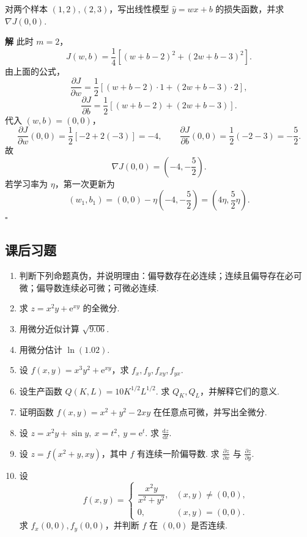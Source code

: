 \documentclass[fontset=fandol]{ctexart}
\newenvironment{solution}{\par\noindent\textbf{解}\quad}{\hfill$\square$\par\vspace{0.8em}}
\newcommand{\dd}{\mathrm{d}}
\newcommand{\ee}{\mathrm{e}}
\begin{document}
\begin{example}
对两个样本 $(1,2),(2,3)$，写出线性模型 $\hat y=wx+b$ 的损失函数，并求 $\nabla J(0,0)$.
\end{example}
\begin{solution}
此时 $m=2$，
\[
J(w,b)=\frac14\left[(w+b-2)^2+(2w+b-3)^2\right].
\]
由上面的公式，
\[
\frac{\partial J}{\partial w}
=\frac12\left[(w+b-2)\cdot1+(2w+b-3)\cdot2\right],
\]
\[
\frac{\partial J}{\partial b}
=\frac12\left[(w+b-2)+(2w+b-3)\right].
\]
代入 $(w,b)=(0,0)$，
\[
\frac{\partial J}{\partial w}(0,0)=\frac12[-2+2(-3)]=-4,\qquad
\frac{\partial J}{\partial b}(0,0)=\frac12(-2-3)=-\frac52.
\]
故
\[
\nabla J(0,0)=\left(-4,-\frac52\right).
\]
若学习率为 $\eta$，第一次更新为
\[
(w_1,b_1)=\left(0,0\right)-\eta\left(-4,-\frac52\right)
=\left(4\eta,\frac52\eta\right).
\]
\end{solution}

\subsection{课后习题}
\begin{enumerate}[label=\textbf{练习\arabic*.},leftmargin=2.2em]
\item 判断下列命题真伪，并说明理由：偏导数存在必连续；连续且偏导存在必可微；偏导数连续必可微；可微必连续.
\item 求 $z=x^2y+\ee^{xy}$ 的全微分.
\item 用微分近似计算 $\sqrt{9.06}$.
\item 用微分估计 $\ln(1.02)$.
\item 设 $f(x,y)=x^3y^2+\ee^{xy}$，求 $f_x,f_y,f_{xy},f_{yx}$.
\item 设生产函数 $Q(K,L)=10K^{1/2}L^{1/2}$. 求 $Q_K,Q_L$，并解释它们的意义.
\item 证明函数 $f(x,y)=x^2+y^2-2xy$ 在任意点可微，并写出全微分.
\item 设 $z=x^2y+\sin y,\ x=t^2,\ y=\ee^t$. 求 $\frac{\dd z}{\dd t}$.
\item 设 $z=f(x^2+y,xy)$，其中 $f$ 有连续一阶偏导数. 求 $\frac{\partial z}{\partial x}$ 与 $\frac{\partial z}{\partial y}$.
\item 设
\[
f(x,y)=
\begin{cases}
\dfrac{x^2y}{x^2+y^2},&(x,y)\neq(0,0),\\[0.6em]
0,&(x,y)=(0,0).
\end{cases}
\]
求 $f_x(0,0),f_y(0,0)$，并判断 $f$ 在 $(0,0)$ 是否连续.
\end{enumerate}
\end{document}
